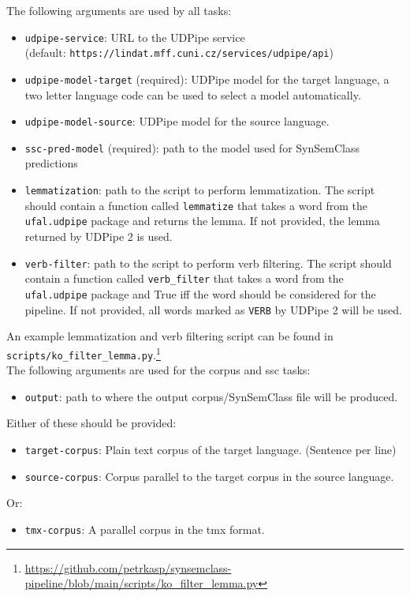 \noindent
The following arguments are used by all tasks:
\begin{itemize}
    \item \texttt{udpipe-service}: URL to the UDPipe service \\ (default: \texttt{https://lindat.mff.cuni.cz/services/udpipe/api})
    \item \texttt{udpipe-model-target} (required): UDPipe model for the target language, a two letter language code can be used to select a model automatically.
    \item \texttt{udpipe-model-source}: UDPipe model for the source language.
    \item \texttt{ssc-pred-model} (required): path to the model used for SynSemClass predictions
    \item \texttt{lemmatization}: path to the script to perform lemmatization. The script should contain a function called \texttt{lemmatize} that takes a word from the \texttt{ufal.udpipe} package and returns the lemma. If not provided, the lemma returned by UDPipe 2 is used.
    \item \texttt{verb-filter}: path to the script to perform verb filtering. The script should contain a function called \texttt{verb\_filter} that takes a word from the \texttt{ufal.udpipe} package and True iff the word should be considered for the pipeline. If not provided, all words marked as \texttt{VERB} by UDPipe 2 will be used.
\end{itemize}

\noindent
An example lemmatization and verb filtering script can be found in \\ \texttt{scripts/ko\_filter\_lemma.py}.\footnote{\url{https://github.com/petrkasp/synsemclass-pipeline/blob/main/scripts/ko_filter_lemma.py}} \\

\noindent
The following arguments are used for the corpus and ssc tasks:
\begin{itemize}
    \item \texttt{output}: path to where the output corpus/SynSemClass file will be produced.
\end{itemize}

\noindent
Either of these should be provided:
\begin{itemize}
    \item \texttt{target-corpus}: Plain text corpus of the target language. (Sentence per line)
    \item \texttt{source-corpus}: Corpus parallel to the target corpus in the source language.
\end{itemize}
Or:
\begin{itemize}
    \item \texttt{tmx-corpus}: A parallel corpus in the tmx format.
\end{itemize}

